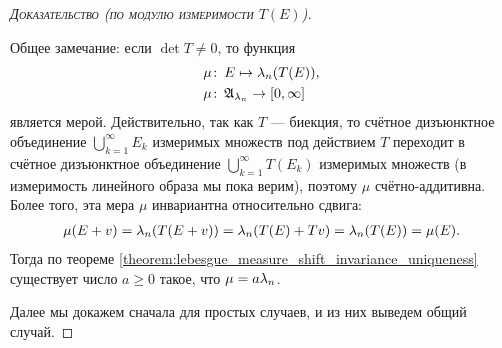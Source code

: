 \begin{proof}[\normalfont\textsc{Доказательство (по модулю измеримости $T(E)$)}]\

 Общее замечание: если $\det T \neq 0$, то функция \begin{align*}
  \mu &\colon\, E \mapsto \lambda_n(T(E)), \\
  \mu &\colon\, \mathfrak{A}_{\lambda_n} \to [0, \infty]
 \end{align*}  является мерой. Действительно, так как $T$ --- биекция, то счётное дизъюнктное объединение $\bigcup_{k=1}^{\infty} E_k$ измеримых множеств под действием $T$ переходит в счётное дизъюнктное объединение $\bigcup_{k=1}^{\infty} T(E_k)$ измеримых множеств (в измеримость линейного образа мы пока верим), поэтому $\mu$ счётно-аддитивна. Более того, эта мера $\mu$ инвариантна относительно сдвига:
 \begin{align*}
  \mu(E + v) = \lambda_n(T(E + v)) = \lambda_n(T(E) + Tv) = \lambda_n(T(E)) = \mu(E)
 .\end{align*} Тогда по теореме \ref{theorem:lebesgue_measure_shift_invariance_uniqueness} существует число $a \geqslant 0$ такое, что $\mu = a \lambda_n$.

 Далее мы докажем сначала для простых случаев, и из них выведем общий случай.


\end{proof}
